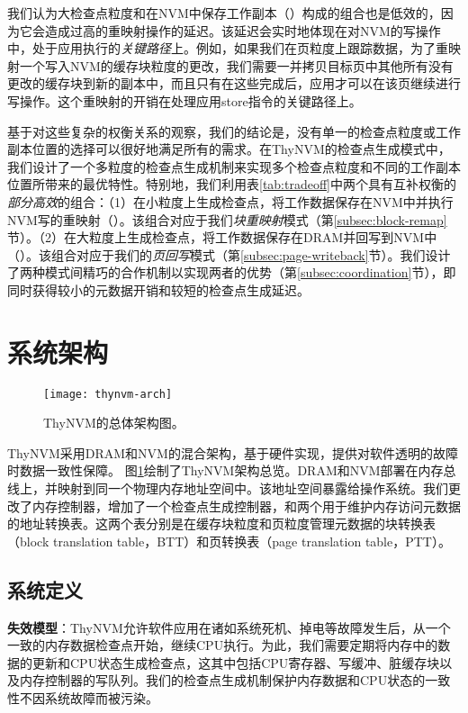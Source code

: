 我们认为大检查点粒度和在NVM中保存工作副本（）构成的组合也是低效的，因为它会造成过高的重映射操作的延迟。该延迟会实时地体现在对NVM的写操作中，处于应用执行的\emph{关键路径}上。例如，如果我们在页粒度上跟踪数据，为了重映射一个写入NVM的缓存块粒度的更改，我们需要一并拷贝目标页中其他所有没有更改的缓存块到新的副本中，而且只有在这些完成后，应用才可以在该页继续进行写操作。这个重映射的开销在处理应用store指令的关键路径上。

基于对这些复杂的权衡关系的观察，我们的结论是，没有单一的检查点粒度或工作副本位置的选择可以很好地满足所有的需求。在ThyNVM的检查点生成模式中，我们设计了一个多粒度的检查点生成机制来实现多个检查点粒度和不同的工作副本位置所带来的最优特性。特别地，我们利用表\ref{tab:tradeoff}中两个具有互补权衡的\emph{部分高效}的组合：（1）在小粒度上生成检查点，将工作数据保存在NVM中并执行NVM写的重映射（）。该组合对应于我们{\em 块重映射}模式（第\ref{subsec:block-remap}节）。（2）在大粒度上生成检查点，将工作数据保存在DRAM并回写到NVM中（）。该组合对应于我们的\emph{页回写}模式（第\ref{subsec:page-writeback}节）。我们设计了两种模式间精巧的合作机制以实现两者的优势（第\ref{subsec:coordination}节），即同时获得较小的元数据开销和较短的检查点生成延迟。

\section{系统架构}

\begin{figure}[!h]
\centering
\texttt{[image: thynvm-arch]}
\caption{ThyNVM的总体架构图。}
\label{fig:thynvm-arch}
\end{figure}

ThyNVM采用DRAM和NVM的混合架构，基于硬件实现，提供对软件透明的故障时数据一致性保障。
图\ref{fig:thynvm-arch}绘制了ThyNVM架构总览。DRAM和NVM部署在内存总线上，并映射到同一个物理内存地址空间中。该地址空间暴露给操作系统。我们更改了内存控制器，增加了一个检查点生成控制器，和两个用于维护内存访问元数据的地址转换表。这两个表分别是在缓存块粒度和页粒度管理元数据的块转换表（block translation table，BTT）和页转换表（page translation table，PTT）。

\subsection{系统定义}

\textbf{失效模型}：ThyNVM允许软件应用在诸如系统死机、掉电等故障发生后，从一个一致的内存数据检查点开始，继续CPU执行。为此，我们需要定期将内存中的数据的更新和CPU状态生成检查点，这其中包括CPU寄存器、写缓冲、脏缓存块以及内存控制器的写队列。我们的检查点生成机制保护内存数据和CPU状态的一致性不因系统故障而被污染。

